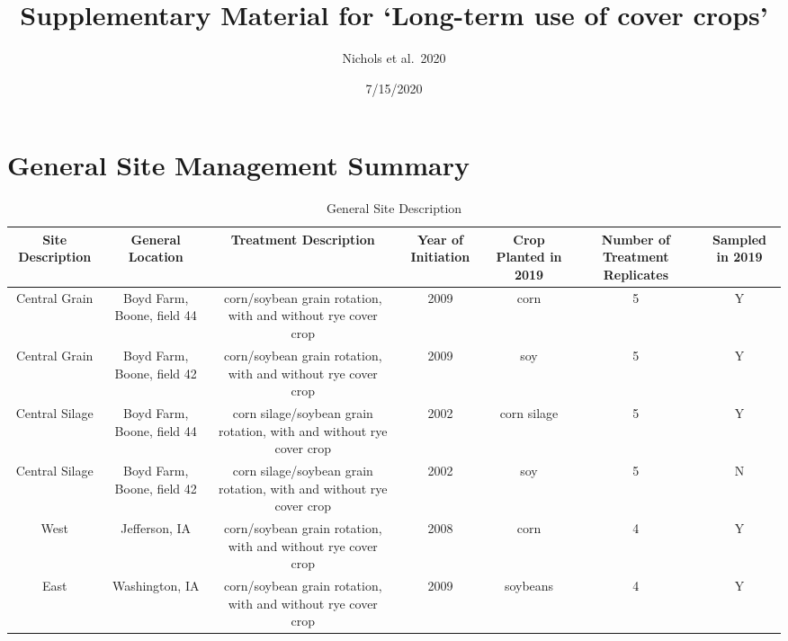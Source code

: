 \documentclass[]{article}
\title{Supplementary Material for `Long-term use of cover crops'}
\author{Nichols et al.~2020}
\date{7/15/2020}
\begin{document}
\maketitle

\hypertarget{general-site-management-summary}{%
\section{General Site Management
Summary}\label{general-site-management-summary}}

\begin{table}[H]

\caption{\label{tab:unnamed-chunk-1}General Site Description}
\centering
\begin{tabular}[t]{ccccccc}
\toprule
Site Description & General Location & Treatment Description & Year of Initiation & Crop Planted in 2019 & Number of Treatment Replicates & Sampled in 2019\\
\midrule
\rowcolor{gray!6}  Central Grain & Boyd Farm, Boone, field 44 & corn/soybean grain rotation, with and without rye cover crop & 2009 & corn & 5 & Y\\
Central Grain & Boyd Farm, Boone, field 42 & corn/soybean grain rotation, with and without rye cover crop & 2009 & soy & 5 & Y\\
\rowcolor{gray!6}  Central Silage & Boyd Farm, Boone, field 44 & corn silage/soybean grain rotation, with and without rye cover crop & 2002 & corn silage & 5 & Y\\
Central Silage & Boyd Farm, Boone, field 42 & corn silage/soybean grain rotation, with and without rye cover crop & 2002 & soy & 5 & N\\
\rowcolor{gray!6}  West & Jefferson, IA & corn/soybean grain rotation, with and without rye cover crop & 2008 & corn & 4 & Y\\
\addlinespace
East & Washington, IA & corn/soybean grain rotation, with and without rye cover crop & 2009 & soybeans & 4 & Y\\
\bottomrule
\end{tabular}
\end{table}

\newpage
\end{document}
